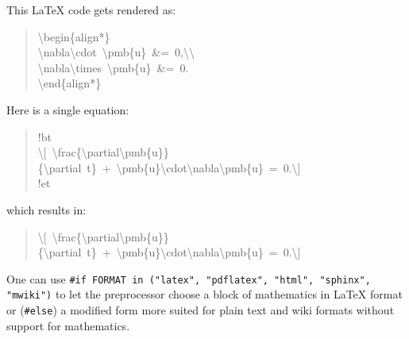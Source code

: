 \documentclass[a4paper]{article}
\begin{document}



This LaTeX code gets rendered as:
%
\begin{quote}{\ttfamily \raggedright \noindent
\textbackslash{}begin\{align*\}\\
\textbackslash{}nabla\textbackslash{}cdot~\textbackslash{}pmb\{u\}~\&=~0,\textbackslash{}\textbackslash{}\\
\textbackslash{}nabla\textbackslash{}times~\textbackslash{}pmb\{u\}~\&=~0.\\
\textbackslash{}end\{align*\}
}
\end{quote}

Here is a single equation:
%
\begin{quote}{\ttfamily \raggedright \noindent
!bt\\
\textbackslash{}{[}~\textbackslash{}frac\{\textbackslash{}partial\textbackslash{}pmb\{u\}\}\{\textbackslash{}partial~t\}~+~\textbackslash{}pmb\{u\}\textbackslash{}cdot\textbackslash{}nabla\textbackslash{}pmb\{u\}~=~0.\textbackslash{}{]}\\
!et
}
\end{quote}

which results in:
%
\begin{quote}{\ttfamily \raggedright \noindent
\textbackslash{}{[}~\textbackslash{}frac\{\textbackslash{}partial\textbackslash{}pmb\{u\}\}\{\textbackslash{}partial~t\}~+~\textbackslash{}pmb\{u\}\textbackslash{}cdot\textbackslash{}nabla\textbackslash{}pmb\{u\}~=~0.\textbackslash{}{]}
}
\end{quote}

One can use \texttt{\#if FORMAT in ("latex", "pdflatex", "html", "sphinx", "mwiki")}
to let the preprocessor choose a block of mathematics in LaTeX format
or (\texttt{\#else}) a modified form more suited for plain text and wiki
formats without support for mathematics.
\end{document}
